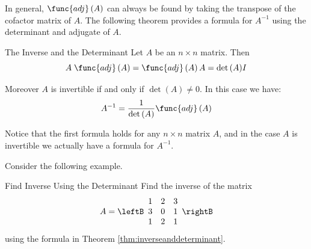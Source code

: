 In general, $\func{adj}\left(A\right)$ can always be found by taking the transpose of the cofactor matrix of $A$. The following theorem provides a formula for $A^{-1}$ using the determinant and adjugate of $A$.

\begin{theorem}{The Inverse and the Determinant}\label{thm:inverseanddeterminant}
Let $A$ be an  $n\times n$ matrix. Then  
\begin{equation*}
A \; \func{adj}\left(A\right) = \func{adj}\left(A\right)A = {\det \left(A\right)} I
\end{equation*}

Moreover $A$ is invertible if and only if  $\det \left(A\right) \neq 0$. In this case 
 we have: 
\begin{equation*}
A^{-1} = \frac{1}{\det \left(A\right)}  \func{adj}\left(A\right)
\end{equation*}
\end{theorem}


Notice that the first formula holds for any $n \times n$ matrix $A$, and in the case $A$ is invertible we actually have a formula for $A^{-1}$.

Consider the following example.

\begin{example}{Find Inverse Using the Determinant}\label{exa:inverseanddeterminant}
Find the inverse of the matrix
\begin{equation*}
A=\leftB
\begin{array}{rrr}
1 & 2 & 3 \\
3 & 0 & 1 \\
1 & 2 & 1
\end{array}
\rightB
\end{equation*}
using the formula in Theorem \ref{thm:inverseanddeterminant}.
\end{example}

